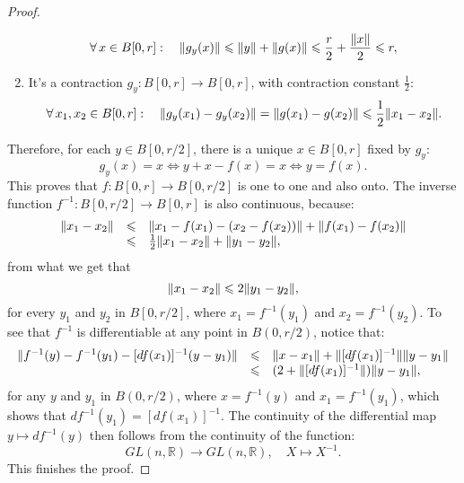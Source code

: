 \begin{proof}
\begin{enumerate}
\[			      \forall\,{x}\in{B[0,r]}:\quad
			      \lVert g_{y}(x)\rVert
			      \leqslant
			      \lVert y\rVert+\lVert g(x)\rVert
			      \leqslant
			      \frac{r}{2}+\frac{\lVert x\rVert}{2}
			      \leqslant
			      r,
		      \]
		\item
		      It's a contraction \(g_{y}:{B[0,r]}\to{B[0,r]}\), with contraction
		      constant \(\frac{1}{2}\):
		      \[
			      \forall\,{x_{1},x_{2}}\in{B[0,r]}:\quad
			      \lVert g_{y}(x_{1})-g_{y}(x_{2})\rVert
			      =
			      \lVert g(x_{1})-g(x_{2})\rVert
			      \leqslant
			      \frac{1}{2}\lVert x_{1}-x_{2}\rVert.
		      \]
	\end{enumerate}
	Therefore, for each \({y}\in{B[0,r/2]}\), there is a unique
	\({x}\in{B[0,r]}\) fixed by \(g_{y}\):
	\[
		g_{y}(x)=x
		\iff
		y + x - f(x) = x
		\iff
		y = f(x).
	\]
	This proves that \(f:{B[0,r]}\to{B[0,r/2]}\) is one to one and also onto. The
	inverse function \(f^{-1}:{B[0,r/2]}\to{B[0,r]}\) is also continuous, because:
	\[
		\begin{array}{rcl}
			\lVert x_{1}-x_{2}\rVert
			 & \leqslant &
			\lVert x_{1}-f(x_{1}) - (x_{2}-f(x_{2}))\rVert
			+
			\lVert f(x_{1})-f(x_{2})\rVert
			\\
			 & \leqslant &
			\frac{1}{2}\lVert x_{1}-x_{2}\rVert
			+
			\lVert y_{1}-y_{2}\rVert,
		\end{array}
	\]
	from what we get that
	\[
		\lVert x_{1}-x_{2}\rVert\leqslant{2\lVert y_{1}-y_{2}\rVert},
	\]
	for every \(y_{1}\) and \(y_{2}\) in \(B[0,r/2]\), where
	\(x_{1}=f^{-1}(y_{1})\) and \(x_{2}=f^{-1}(y_{2})\). To see that \(f^{-1}\) is
	differentiable at any point in \(B(0,r/2)\), notice that:
	\[
		\begin{array}{rcl}
			\lVert f^{-1}(y)-f^{-1}(y_{1})-[df(x_{1})]^{-1}(y-y_{1})\rVert
			 & \leqslant &
			\lVert x-x_{1}\rVert
			+
			\lVert[df(x_{1})]^{-1}\rVert\lVert y-y_{1}\rVert
			\\
			 & \leqslant &
			(2+\lVert[df(x_{1})]^{-1}\rVert)\lVert y-y_{1}\rVert,
		\end{array}
	\]
	for any \(y\) and \(y_{1}\) in \(B(0,r/2)\), where \(x=f^{-1}(y)\) and
	\(x_{1}=f^{-1}(y_{1})\), which shows that \(df^{-1}(y_{1})=[df(x_{1})]^{-1}\).
	The continuity of the differential map \({y}\mapsto{df^{-1}(y)}\) then follows
	from the continuity of the function:
	\[
		{GL(n,\mathbb{R})}\to{GL(n,\mathbb{R})},\quad{{X}\mapsto{X^{-1}}}.
	\]
	This finishes the proof.
\end{proof}
